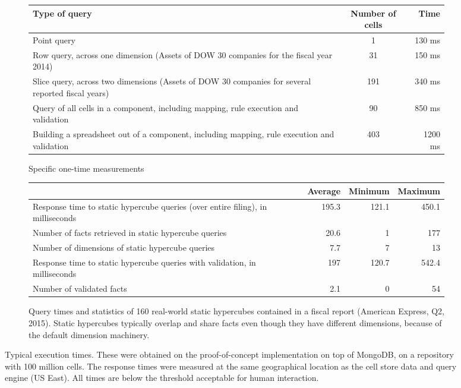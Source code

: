 \documentclass{acm_proc_article-sp}
\begin{document}
\begin{figure*}

\begin{subfigure}[c]{\linewidth}
\centering
\begin{tabular}{lcr}
\hline
\hline
Type of query & Number of cells & Time \\
\hline
\hline
Point query & 1 & 130 ms \\
\hline
Row query, across one dimension (Assets of DOW 30 companies for the fiscal year 2014)&31& 150 ms \\
\hline
Slice query, across two dimensions (Assets of DOW 30 companies for several reported fiscal years)&191& 340 ms \\
\hline
Query of all cells in a component, including mapping, rule execution and validation& 90& 850 ms \\
\hline
Building a spreadsheet out of a component, including mapping, rule execution and validation & 403 & 1200 ms \\
\hline
\end{tabular}
\caption{Specific one-time measurements}
\end{subfigure}

\begin{subfigure}[c]{\linewidth}
\centering
\begin{tabular}{lrrr}
\hline
\hline
&Average & Minimum &Maximum\\
\hline
Response time to static hypercube queries (over entire filing), in milliseconds&195.3&121.1&450.1\\
Number of facts retrieved in static hypercube queries&20.6&1&177\\
Number of dimensions of static hypercube queries&7.7&7&13\\
Response time to static hypercube queries with validation, in milliseconds&197&120.7&542.4\\
Number of validated facts&2.1&0&54\\
\hline
\end{tabular}
\caption{Query times and statistics of 160 real-world static hypercubes contained in a fiscal report (American Express, Q2, 2015). Static hypercubes typically overlap and share facts even though they have different dimensions, because of the default dimension machinery.}
\end{subfigure}

\vspace{3mm}
\caption{Typical execution times. These were obtained on the proof-of-concept implementation on top of MongoDB, on a repository with 100 million cells. The response times were measured at the same geographical location as the cell store data and query engine (US East). All times are below the threshold acceptable for human interaction.}
\label{fig-measurements}
\end{figure*}
\end{document}

